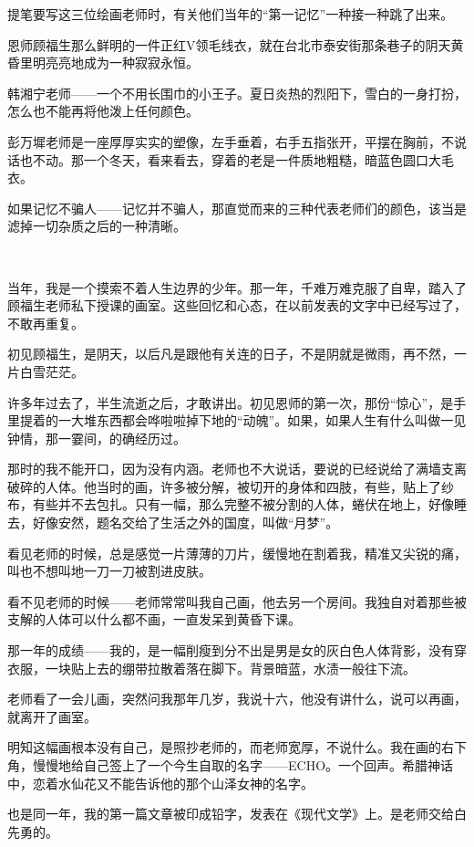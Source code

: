 \par 提笔要写这三位绘画老师时，有关他们当年的“第一记忆”一种接一种跳了出来。
\par 恩师顾福生那么鲜明的一件正红V领毛线衣，就在台北市泰安街那条巷子的阴天黄昏里明亮亮地成为一种寂寂永恒。
\par 韩湘宁老师——一个不用长围巾的小王子。夏日炎热的烈阳下，雪白的一身打扮，怎么也不能再将他泼上任何颜色。
\par 彭万墀老师是一座厚厚实实的塑像，左手垂着，右手五指张开，平摆在胸前，不说话也不动。那一个冬天，看来看去，穿着的老是一件质地粗糙，暗蓝色圆口大毛衣。
\par 如果记忆不骗人——记忆并不骗人，那直觉而来的三种代表老师们的颜色，该当是滤掉一切杂质之后的一种清晰。
\par  
\par 当年，我是一个摸索不着人生边界的少年。那一年，千难万难克服了自卑，踏入了顾福生老师私下授课的画室。这些回忆和心态，在以前发表的文字中已经写过了，不敢再重复。
\par 初见顾福生，是阴天，以后凡是跟他有关连的日子，不是阴就是微雨，再不然，一片白雪茫茫。
\par 许多年过去了，半生流逝之后，才敢讲出。初见恩师的第一次，那份“惊心”，是手里提着的一大堆东西都会哗啦啦掉下地的“动魄”。如果，如果人生有什么叫做一见钟情，那一霎间，的确经历过。
\par 那时的我不能开口，因为没有内涵。老师也不大说话，要说的已经说给了满墙支离破碎的人体。他当时的画，许多被分解，被切开的身体和四肢，有些，贴上了纱布，有些并不去包扎。只有一幅，那么完整不被分割的人体，蜷伏在地上，好像睡去，好像安然，题名交给了生活之外的国度，叫做“月梦”。
\par 看见老师的时候，总是感觉一片薄薄的刀片，缓慢地在割着我，精准又尖锐的痛，叫也不想叫地一刀一刀被割进皮肤。
\par 看不见老师的时候——老师常常叫我自己画，他去另一个房间。我独自对着那些被支解的人体可以什么都不画，一直发呆到黄昏下课。
\par 那一年的成绩——我的，是一幅削瘦到分不出是男是女的灰白色人体背影，没有穿衣服，一块贴上去的绷带拉散着落在脚下。背景暗蓝，水渍一般往下流。
\par 老师看了一会儿画，突然问我那年几岁，我说十六，他没有讲什么，说可以再画，就离开了画室。
\par 明知这幅画根本没有自己，是照抄老师的，而老师宽厚，不说什么。我在画的右下角，慢慢地给自己签上了一个今生自取的名字——ECHO。一个回声。希腊神话中，恋着水仙花又不能告诉他的那个山泽女神的名字。
\par 也是同一年，我的第一篇文章被印成铅字，发表在《现代文学》上。是老师交给白先勇的。
